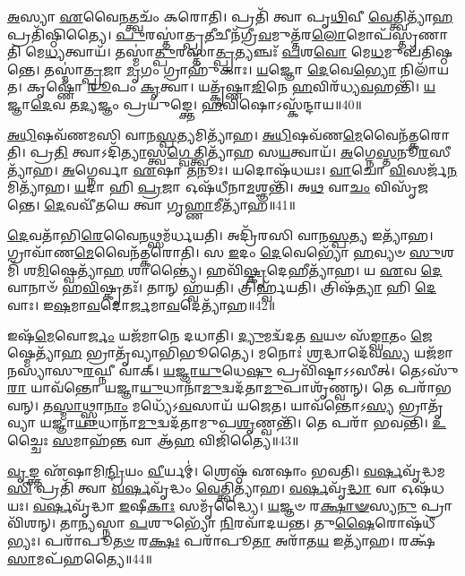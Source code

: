 \-\ul{𑌅}\-𑌸𑍍𑌯𑌾 \ul{𑌏}\-𑌵𑍈\-\ul{𑌨}\-𑌤𑍍𑌤𑍍𑌵𑌚𑌂᳴ 𑌕𑌰𑍋𑌤𑌿।
𑌪𑍍𑌰𑌤𑌿᳴ 𑌤𑍍𑌵𑌾 𑌪𑍃\-\ul{𑌥𑌿}\-𑌵𑍀 \ul{𑌵𑍇}\-𑌤𑍍𑌤𑍍𑌵𑌿𑌤𑍍𑌯𑌾᳴\-\ul{𑌹} 𑌪𑍍𑌰𑌤𑌿᳴\-𑌷𑍍𑌠𑌿𑌤𑍍𑌯𑍈।
\-\ul{𑌪𑍁}\-𑌰𑌸𑍍𑌤𑌾॑𑌤𑍍𑌪𑍍𑌰\-\ul{𑌤𑍀}\-𑌚𑍀𑌨᳴𑌗𑍍𑌰𑍀\-\ul{𑌵}\-𑌮𑍁𑌤𑍍𑌤᳴𑌰\-\ul{𑌲𑍋}\-𑌮𑍋𑌪᳴𑌸𑍍𑌤𑍃𑌣𑌾𑌤𑌿 𑌮𑍇\-\ul{𑌧𑍍𑌯}\-𑌤𑍍𑌵𑌾𑌯᳴।
𑌤𑌸𑍍𑌮𑌾॑\-\ul{𑌤𑍍𑌪𑍁}\-𑌰𑌸𑍍𑌤𑌾॑\-\ul{𑌤𑍍𑌪𑍍𑌰}\-𑌤𑍍𑌯𑌞𑍍𑌚𑌃᳴ \ul{𑌪}\-𑌶\-\ul{𑌵𑍋} 𑌮𑍇\-\ul{𑌧}\-𑌮𑍁𑌪᳴𑌤𑌿𑌷𑍍𑌠𑌨𑍍𑌤𑍇।
𑌤𑌸𑍍𑌮𑌾॑\-\ul{𑌤𑍍𑌪𑍍𑌰}\-𑌜𑌾 \ul{𑌮𑍃}\-𑌗𑌂 𑌗𑍍𑌰𑌾𑌹𑍁᳴𑌕𑌾𑌃।
\-\ul{𑌯}\-𑌜𑍍𑌞𑍋 \ul{𑌦𑍇}\-𑌵𑍇\-\ul{𑌭𑍍𑌯𑍋} 𑌨𑌿𑌲𑌾᳴𑌯𑌤।
𑌕𑍃𑌷𑍍𑌣𑍋᳴ \ul{𑌰𑍂}\-𑌪𑌂 \ul{𑌕𑍃}\-𑌤𑍍𑌵𑌾।
𑌯𑌤𑍍𑌕𑍃᳴𑌷𑍍𑌣𑌾\-\ul{𑌜𑌿}\-𑌨𑍇 \ul{𑌹}\-𑌵𑌿𑌰᳴𑌧𑍍𑌯\-\ul{𑌵}\-𑌹𑌨𑍍𑌤𑌿᳴।
\-\ul{𑌯}\-𑌜𑍍𑌞𑌾\-\ul{𑌦𑍇}\-𑌵 𑌤\-\ul{𑌦𑍍𑌯}\-𑌜𑍍𑌞𑌂 𑌪𑍍𑌰𑌯𑍁᳴𑌙𑍍𑌕𑍍𑌤𑍇।
\-\ul{𑌹}\-𑌵𑌿𑌷𑍋\-𑌽𑌸𑍍𑌕᳴𑌨𑍍𑌦𑌾𑌯॥40॥

\-\ul{𑌅}\-\-\ul{𑌧𑌿}\-𑌷𑌵᳴𑌣𑌮𑌸𑌿 𑌵𑌾𑌨\-\ul{𑌸𑍍𑌪}\-𑌤𑍍𑌯𑌮𑌿𑌤𑍍𑌯𑌾᳴𑌹।
\-\ul{𑌅}\-\-\ul{𑌧𑌿}\-𑌷𑌵᳴𑌣\-\-\ul{𑌮𑍇}\-𑌵𑍈𑌨᳴𑌤𑍍𑌕𑌰𑍋𑌤𑌿।
𑌪𑍍𑌰\-\ul{𑌤𑌿} 𑌤𑍍𑌵𑌾\-𑌽𑌦𑌿᳴\-\ul{𑌤𑍍𑌯𑌾}\-𑌸𑍍𑌤𑍍𑌵\-\ul{𑌗𑍍𑌵𑍇}\-𑌤𑍍𑌤𑍍𑌵𑌿𑌤𑍍𑌯𑌾᳴𑌹 𑌸\-\ul{𑌯}\-𑌤𑍍𑌵𑌾𑌯᳴।
\-\ul{𑌅}\-𑌗𑍍𑌨𑍇\-\ul{𑌸𑍍𑌤}\-𑌨𑍂\-\ul{𑌰}\-𑌸𑍀\-𑌤𑍍𑌯𑌾᳴𑌹।
\-\ul{𑌅}\-𑌗𑍍𑌨𑍇𑌰𑍍𑌵𑌾 \ul{𑌏}\-𑌷𑌾 \ul{𑌤}\-𑌨𑍂𑌃।
𑌯𑌦𑍋𑌷᳴𑌧𑌯𑌃।
\-\ul{𑌵𑌾}\-𑌚𑍋 \ul{𑌵𑌿}\-𑌸𑌰𑍍𑌜᳴\-\ul{𑌨}\-𑌮𑌿𑌤𑍍𑌯𑌾᳴𑌹।
\-\ul{𑌯}\-𑌦𑌾 𑌹𑌿 \ul{𑌪𑍍𑌰}\-𑌜𑌾 𑌓𑌷᳴𑌧𑍀𑌨𑌾\-\ul{𑌮}\-𑌶𑍍𑌞𑌨𑍍𑌤𑌿᳴।
𑌅\-\ul{𑌥} 𑌵𑌾\-\ul{𑌚𑌂} 𑌵𑌿𑌸𑍃᳴𑌜𑌨𑍍𑌤𑍇।
\-\ul{𑌦𑍇}\-𑌵𑌵𑍀᳴𑌤𑌯𑍇 𑌤𑍍𑌵𑌾 𑌗𑍃\-\ul{𑌹𑍍𑌣𑌾}\-𑌮𑍀𑌤𑍍𑌯𑌾᳴𑌹॥41॥

\-\ul{𑌦𑍇}\-𑌵𑌤𑌾᳴𑌭𑌿\-\ul{𑌰𑍇}\-𑌵𑍈\-\ul{𑌨}\-𑌥𑍍𑌸𑌮᳴𑌰𑍍𑌧𑌯𑌤𑌿।
𑌅𑌦𑍍𑌰𑌿᳴𑌰𑌸𑌿 𑌵𑌾𑌨\-\ul{𑌸𑍍𑌪}\-𑌤𑍍𑌯 𑌇𑌤𑍍𑌯𑌾᳴𑌹।
𑌗𑍍𑌰𑌾𑌵𑌾᳴𑌣\-\ul{𑌮𑍇}\-𑌵𑍈𑌨᳴𑌤𑍍𑌕𑌰𑍋𑌤𑌿।
𑌸 \ul{𑌇}\-𑌦𑌂 \ul{𑌦𑍇}\-𑌵𑍇𑌭𑍍𑌯𑍋᳴ \ul{𑌹}\-𑌵𑍍𑌯𑍞 \ul{𑌸𑍁}\-𑌶𑌮𑌿᳴ 𑌶\-\ul{𑌮𑌿}\-𑌷𑍍𑌵𑍇𑌤𑍍𑌯𑌾᳴\-\ul{𑌹} 𑌶𑌾𑌨𑍍𑌤𑍍𑌯𑍈॑।
𑌹𑌵𑌿᳴\-\ul{𑌷𑍍𑌕𑍃}\-𑌦𑍇𑌹𑍀𑌤𑍍𑌯𑌾᳴𑌹।
𑌯 \ul{𑌏}\-𑌵 \ul{𑌦𑍇}\-𑌵𑌾𑌨𑌾𑍞᳴ 𑌹\-\ul{𑌵𑌿}\-𑌷𑍍𑌕𑍃𑌤𑌃᳴।
𑌤𑌾𑌨𑍍‌ 𑌹𑍍𑌵᳴𑌯𑌤𑌿।
𑌤𑍍𑌰𑌿𑌰𑍍𑌹𑍍𑌵᳴𑌯𑌤𑌿।
𑌤𑍍𑌰𑌿𑌷᳴\-\ul{𑌤𑍍𑌯𑌾} 𑌹𑌿 \ul{𑌦𑍇}\-𑌵𑌾𑌃।
𑌇\-\ul{𑌷}\-𑌮𑌾\-\ul{𑌵}\-𑌦𑍋\-\ul{𑌰𑍍𑌜}\-𑌮𑌾\-\ul{𑌵}\-𑌦𑍇𑌤𑍍𑌯𑌾᳴𑌹॥42॥

𑌇𑌷᳴\-\ul{𑌮𑍇}\-𑌵𑍋\-\ul{𑌰𑍍𑌜𑌂} 𑌯𑌜᳴𑌮𑌾𑌨𑍇 𑌦𑌧𑌾𑌤𑌿।
\-\ul{𑌦𑍍𑌯𑍁}\-𑌮𑌦𑍍𑌵᳴𑌦𑌤 \ul{𑌵}\-𑌯𑍞 𑌸᳴\-\ul{𑌙𑍍𑌘𑌾}\-𑌤𑌂 \ul{𑌜𑍇}\-𑌷𑍍𑌮𑍇𑌤𑍍𑌯𑌾᳴\-\ul{𑌹} 𑌭𑍍𑌰𑌾𑌤𑍃᳴𑌵𑍍𑌯𑌾𑌭𑌿𑌭𑍂𑌤𑍍𑌯𑍈।
𑌮𑌨𑍋𑌃॑ \ul{𑌶𑍍𑌰}\-𑌦𑍍𑌧𑌾𑌦𑍇᳴𑌵\-\ul{𑌸𑍍𑌯} 𑌯𑌜᳴𑌮𑌾𑌨𑌸𑍍𑌯𑌾\-𑌸𑍁\-\ul{𑌰}\-𑌘𑍍𑌨𑍀 𑌵𑌾𑌕𑍍।
\-\ul{𑌯}\-\-\ul{𑌜𑍍𑌞𑌾}\-\-\ul{𑌯𑍁}\-𑌧𑍇\-\ul{𑌷𑍁} 𑌪𑍍𑌰𑌵𑌿᳴𑌷𑍍𑌟𑌾\-𑌽𑌽𑌸𑍀𑌤𑍍।
𑌤𑍇𑌽𑌸𑍁᳴\-\ul{𑌰𑌾} 𑌯𑌾𑌵᳴𑌨𑍍𑌤𑍋 𑌯𑌜𑍍𑌞𑌾\-\ul{𑌯𑍁}\-𑌧𑌾𑌨𑌾᳴\-\ul{𑌮𑍁}\-𑌦𑍍𑌵𑌦᳴𑌤𑌾\-\ul{𑌮𑍁}\-𑌪𑌾𑌶𑍃᳴𑌣𑍍𑌵𑌨𑍍।
𑌤𑍇 𑌪𑌰𑌾᳴𑌭𑌵𑌨𑍍।
𑌤\-\ul{𑌸𑍍𑌮𑌾}\-𑌥𑍍𑌸𑍍𑌵𑌾\-\ul{𑌨𑌾𑌂} 𑌮𑌧𑍍𑌯𑍇᳴\-𑌽\-\ul{𑌵}\-𑌸𑌾𑌯᳴ 𑌯𑌜𑍇𑌤।
𑌯𑌾𑌵᳴𑌨𑍍𑌤𑍋\-𑌽\-\ul{𑌸𑍍𑌯} 𑌭𑍍𑌰𑌾𑌤𑍃᳴𑌵𑍍𑌯𑌾 𑌯𑌜𑍍𑌞𑌾\-\ul{𑌯𑍁}\-𑌧𑌾𑌨𑌾᳴\-\-\ul{𑌮𑍁}\-𑌦𑍍𑌵𑌦᳴𑌤𑌾𑌮𑍁𑌪\-\-\ul{𑌶𑍃}\-𑌣𑍍𑌵𑌨𑍍𑌤𑌿᳴।
𑌤𑍇 𑌪𑌰𑌾᳴ 𑌭𑌵𑌨𑍍𑌤𑌿।
\-\ul{𑌉}\-𑌚𑍍𑌚𑍈𑌃 \ul{𑌸}\-𑌮𑌾𑌹᳴\-\ul{𑌨𑍍𑌤} 𑌵𑌾 𑌆᳴\-\ul{𑌹} 𑌵𑌿𑌜𑌿᳴𑌤𑍍𑌯𑍈॥43॥

\-\ul{𑌵𑍃}\-𑌙𑍍𑌕𑍍𑌤 𑌏᳴𑌷𑌾𑌮𑌿\-\ul{𑌨𑍍𑌦𑍍𑌰𑌿}\-𑌯𑌂 \ul{𑌵𑍀}\-𑌰𑍍𑌯𑌮𑍍॑।
𑌶𑍍𑌰𑍇𑌷𑍍𑌠᳴ 𑌏𑌷𑌾𑌂 𑌭𑌵𑌤𑌿।
\-\ul{𑌵}\-\-\ul{𑌰𑍍}\-𑌷𑌵𑍃᳴𑌦𑍍𑌧𑌮\-\ul{𑌸𑌿} 𑌪𑍍𑌰𑌤𑌿᳴ 𑌤𑍍𑌵𑌾 \ul{𑌵}\-\-\ul{𑌰𑍍}\-𑌷𑌵𑍃᳴𑌦𑍍𑌧𑌂 \ul{𑌵𑍇}\-𑌤𑍍𑌤𑍍𑌵𑌿𑌤𑍍𑌯𑌾᳴𑌹।
\-\ul{𑌵}\-\-\ul{𑌰𑍍}\-𑌷𑌵𑍃᳴\-\ul{𑌦𑍍𑌧𑌾} 𑌵𑌾 𑌓𑌷᳴𑌧𑌯𑌃।
\-\ul{𑌵}\-\-\ul{𑌰𑍍}\-𑌷𑌵𑍃᳴𑌦𑍍𑌧𑌾 \ul{𑌇}\-𑌷𑍀\-\ul{𑌕𑌾𑌃} 𑌸𑌮𑍃᳴𑌦𑍍𑌧𑍍𑌯𑍈।
\-\ul{𑌯}\-𑌜𑍍𑌞𑍞 𑌰\-\ul{𑌕𑍍𑌷𑌾}\-\-\ul{𑍟}\-𑌸𑍍𑌯\-\ul{𑌨𑍁} 𑌪𑍍𑌰𑌾𑌵𑌿᳴𑌶𑌨𑍍।
𑌤𑌾\-\ul{𑌨𑍍𑌯}\-𑌸𑍍𑌨𑌾 \ul{𑌪}\-𑌶𑍁𑌭𑍍𑌯𑍋᳴ \ul{𑌨𑌿}\-𑌰𑌵𑌾᳴𑌦𑌯𑌨𑍍𑌤।
𑌤𑍁\-\ul{𑌷𑍈}\-𑌰𑍋𑌷᳴𑌧𑍀𑌭𑍍𑌯𑌃।
𑌪𑌰𑌾᳴𑌪𑍂\-\ul{𑌤}\-\-\ul{𑍞} 𑌰\-\ul{𑌕𑍍𑌷𑌃} 𑌪𑌰𑌾᳴𑌪𑍂\-\ul{𑌤𑌾} 𑌅𑌰𑌾᳴𑌤\-\ul{𑌯} 𑌇𑌤𑍍𑌯𑌾᳴𑌹।
𑌰𑌕𑍍𑌷᳴\-\ul{𑌸𑌾}\-𑌮𑌪᳴𑌹𑌤𑍍𑌯𑍈॥44॥

